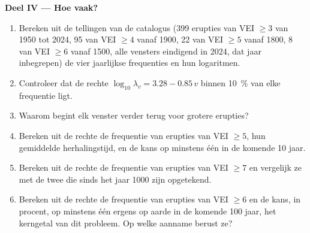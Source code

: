 \begin{problem}
\noindent\textbf{Deel IV --- Hoe vaak?}
\begin{enumerate}[resume]
\item Bereken uit de tellingen van de catalogus (399 erupties van VEI $\ge 3$ van 1950 tot
2024, 95 van VEI $\ge 4$ vanaf 1900, 22 van VEI $\ge 5$ vanaf 1800, 8 van VEI $\ge 6$ vanaf
1500, alle vensters eindigend in 2024, dat jaar inbegrepen) de vier jaarlijkse frequenties en
hun logaritmen.
\item Controleer dat de rechte $\log_{10}\lambda_v = 3.28 - 0.85\,v$ binnen
\qty{10}{\percent} van elke frequentie ligt.
\item Waarom begint elk venster verder terug voor grotere erupties?
\item Bereken uit de rechte de frequentie van erupties van VEI $\ge 5$, hun gemiddelde
herhalingstijd, en de kans op minstens één in de komende 10 jaar.
\item Bereken uit de rechte de frequentie van erupties van VEI $\ge 7$ en vergelijk ze
met de twee die sinds het jaar 1000 zijn opgetekend.
\item Bereken uit de rechte de frequentie van erupties van VEI $\ge 6$ en de
kans, in procent, op minstens één ergens op aarde in de komende 100
jaar, het kerngetal van dit probleem. Op welke aanname berust ze?
\end{enumerate}
\end{problem}
